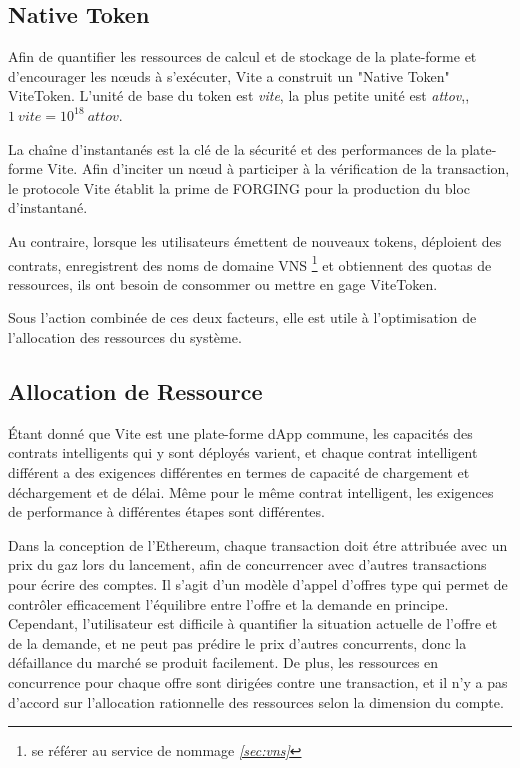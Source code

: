 \documentclass[UTF8,nofonts]{article}
\begin{document}
\begin{multicols}{2}
\subsection{Native Token}
Afin de quantifier les ressources de calcul et de stockage de la plate-forme et d'encourager les nœuds à s'exécuter, Vite a construit un "Native Token" ViteToken. L'unité de base du token est \textit{vite}, la plus petite unité est \textit{attov},,$1 \: vite = 10^{18} \: attov$.

La chaîne d'instantanés est la clé de la sécurité et des performances de la plate-forme Vite. Afin d'inciter un nœud à participer à la vérification de la transaction, le protocole Vite établit la prime de FORGING pour la production du bloc d'instantané.

Au contraire, lorsque les utilisateurs émettent de nouveaux tokens, déploient des contrats, enregistrent des noms de domaine VNS \footnote{se référer au service de nommage \textit{\ref{sec:vns}}} et obtiennent des quotas de ressources, ils ont besoin de consommer ou mettre en gage ViteToken.

Sous l'action combinée de ces deux facteurs, elle est utile à l'optimisation de l'allocation des ressources du système.

\subsection{Allocation de Ressource}
Étant donné que Vite est une plate-forme dApp commune, les capacités des contrats intelligents qui y sont déployés varient, et chaque contrat intelligent différent a des exigences différentes en termes de capacité de chargement et déchargement et de délai. Même pour le même contrat intelligent, les exigences de performance à différentes étapes sont différentes.

Dans la conception de l'Ethereum, chaque transaction doit étre attribuée avec un prix du gaz lors du lancement,  afin de concurrencer avec d'autres transactions pour écrire des comptes. Il s'agit d'un modèle d'appel d'offres type qui permet de contrôler efficacement l'équilibre entre l'offre et la demande en principe. Cependant, l'utilisateur est difficile à quantifier la situation actuelle de l'offre et de la demande, et ne peut pas prédire le prix d'autres concurrents, donc la défaillance du marché se produit facilement. De plus, les ressources en concurrence pour chaque offre sont dirigées contre une transaction, et il n'y a pas d'accord sur l'allocation rationnelle des ressources selon la dimension du compte.



\end{multicols}
\end{document}
